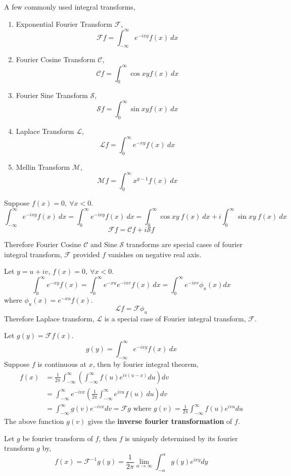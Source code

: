 \begin{remark} A few commonly used integral transforms,
\begin{enumerate}
	\item Exponential Fourier Transform $\mathscr{F}$,
		\[ \mathscr{F}f = \int_{-\infty}^\infty e^{-ixy}f(x)\ dx \]
	\item Fourier Cosine Transform $\mathscr{C}$,
		\[ \mathscr{C}f = \int_0^\infty \cos xy f(x)\ dx \]
	\item Fourier Sine Transform $\mathscr{S}$,
		\[ \mathscr{S}f = \int_0^\infty \sin xy f(x)\ dx \]
	\item Laplace Transform $\mathscr{L}$,
		\[ \mathscr{L}f = \int_0^\infty e^{-xy} f(x)\ dx \]
	\item Mellin Transform $\mathscr{M}$,
		\[ \mathscr{M}f = \int_0^\infty x^{y-1}f(x)\ dx \]
\end{enumerate}
\end{remark}

\begin{remark} Suppose \( f(x) = 0,\ \forall x < 0 \).
	\[ \int_{-\infty}^\infty e^{-ixy}f(x)\ dx = \int_0^\infty e^{-ixy}f(x)\ dx = \int_0^\infty \cos xy \ f(x)\ dx + i \int_0^\infty \sin xy \ f(x)\ dx \]
	\[ \mathscr{F}f = \mathscr{C}f + i\mathscr{S}f \]

	Therefore Fourier Cosine $\mathscr{C}$ and Sine $\mathscr{S}$ transforms are special cases of fourier integral transform, $\mathscr{F}$ provided $f$ vanishes on negative real axis.
\end{remark}

\begin{remark} Let \( y = u+iv \), \( f(x) = 0,\ \forall x < 0 \).
	\[ \int_0^\infty e^{-xy}f(x) = \int_0^\infty e^{-xu}e^{-ixv}f(x)\ dx = \int_0^\infty e^{-ixv} \phi_u(x) dx \]
	where \( \phi_u(x) = e^{-xu}f(x) \).
	\[ \mathscr{L}f = \mathscr{F}\phi_u \]
	Therefore Laplace transform, $\mathscr{L}$ is a special case of Fourier integral transform, $\mathscr{F}$.
\end{remark}

\begin{remark} Let \( g(y) = \mathscr{F}f(x) \).
	\[ g(y) = \int_{-\infty}^\infty e^{-ixy}f(x)\ dx \]
	Suppose $f$ is continuous at $x$, then by fourier integral theorem,
	\begin{align*}
		f(x)	& = \frac{1}{2\pi} \int_{-\infty}^\infty \left( \int_{-\infty}^\infty f(u) e^{iv(u-x)} du \right) dv\\
			& = \int_{-\infty}^\infty e^{-ivx} \left( \frac{1}{2\pi} \int_{-\infty}^\infty e^{ivu} f(u)\ du \right) dv\\
			& = \int_{-\infty}^\infty g(v) e^{-ivx} dv = \mathscr{F}g \text{ where } g(v) = \frac{1}{2\pi}\int_{-\infty}^\infty f(u) e^{ivu} du 
	\end{align*}
	The above function $g(v)$ gives the \textbf{inverse fourier transformation} of $f$.

	Let $g$ be fourier transform of $f$, then $f$ is uniquely determined by its fourier transform $g$ by,
	\[ f(x) = \mathscr{F}^{-1}g(y) = \frac{1}{2\pi} \lim_{\alpha \to \infty} \int_{-\alpha}^\alpha g(y) e^{ixy} dy \]
\end{remark}

